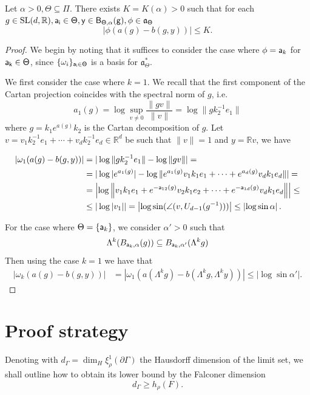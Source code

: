 \documentclass{report}
\begin{document}
\begin{lemma}\label{lem:busemann}
Let $\alpha > 0, \Theta \subseteq \Pi$.
There exists $K = K(\alpha) > 0$ such that for each $g \in \operatorname{{\mathrm{SL}}}(d, \mathbb R), \sf{a_i} \in \Theta, y \in B_{\Theta, \alpha}(g), \phi \in \mathfrak a_\Theta$
\[
    |\phi (a(g) - b(g, y))| \leq K.
\]
\end{lemma}\begin{proof}
We begin by noting that it suffices to consider the case where $\phi = {\sf a}_k$
for $\sf a_k \in \Theta$, since $\{ \omega_i \}_{\sf a_i \in \Theta} $ 
is a basis for $\mathfrak a_\Theta^*$.

We first consider the case where $k=1$.
We recall that the first component of the Cartan projection coincides with the spectral norm of $g$, i.e.
\[
a_1(g) = \log \sup_{v \neq 0} \frac{\| g v\|}{\|v\|} = \log \|g k_2^{-1} e_1 \|
\] 
where $g = k_1 e^{a(g)} k_2$ is the Cartan decomposition of $g$.
Let $v = v_1 k_2^{-1} e_1 + \cdots + v_d k_2^{-1} e_d \in \mathbb R^d$ be such that $\|v\| = 1$ and $y = \mathbb R v$, we have

\begin{align*}
    |\omega_1(a(g) - b(g, y))| &=
    |\log \|g k_2^{-1} e_1 \| - \log \|g v \| | =\\
    &= |\log |e^{a_1(g)}| - \log \| e^{a_1(g)} v_1 k_1 e_1 + \cdots + e^{a_d(g)} v_d k_1 e_d \| | =\\
    &= \left| \log \left\| v_1 k_1 e_1 + e^{-{\sf a}_{12}(g)} v_2 k_1 e_2 + \cdots
    +  e^{-{\sf a}_{1d}(g)} v_d k_1 e_d \right\| \right| \leq\\
    &\leq |\log |v_1| | = \left| \log \sin( \angle(v, U_{d-1}(g^{-1}))) \right| \leq \left| \log \sin \alpha \right|.
\end{align*}

For the case where $\Theta = \{ {\sf a}_k \}$, we consider $\alpha' > 0$ such that
\[
\Lambda^k (B_{{\sf a}_k, \alpha}(g)) \subseteq B_{{\sf a}_k, \alpha'}(\Lambda^k g)
\]
Then using the case $k=1$ we have that
\begin{align*}
    |\omega_k(a(g) - b(g, y))| &=
    |\omega_1(a(\Lambda^k g) - b(\Lambda^k g, \Lambda^k y))| \leq \left| \log \sin \alpha' \right| .
\end{align*}
\end{proof}

\section{Proof strategy}\label{sec:ProofStrategy}
Denoting with $d_\Gamma = \dim_H \xi_\rho^1(\partial \Gamma)$ the Hausdorff  dimension of the limit set, we shall outline how to obtain its lower bound by the Falconer dimension
\[
    d_\Gamma \geq h_\rho(F).
\]
\end{document}
